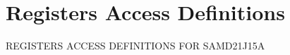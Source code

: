 \hypertarget{group___s_a_m_d21_j15_a__reg}{}\section{Registers Access Definitions}
\label{group___s_a_m_d21_j15_a__reg}
R\+E\+G\+I\+S\+T\+E\+RS A\+C\+C\+E\+SS D\+E\+F\+I\+N\+I\+T\+I\+O\+NS F\+OR S\+A\+M\+D21\+J15A 